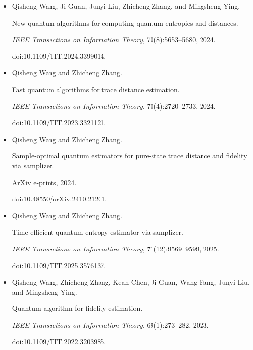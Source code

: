 \begin{itemize}
doi:10.1109/TIT.2024.3447915.





\item[] 
[40]

Qisheng Wang, Ji Guan, Junyi Liu, Zhicheng Zhang, and Mingsheng Ying.


New quantum algorithms for computing quantum entropies and distances.


\emph{IEEE Transactions on Information Theory}, 70(8):5653–5680,
2024.


doi:10.1109/TIT.2024.3399014.





\item[] 
[41]

Qisheng Wang and Zhicheng Zhang.


Fast quantum algorithms for trace distance estimation.


\emph{IEEE Transactions on Information Theory}, 70(4):2720–2733,
2024.


doi:10.1109/TIT.2023.3321121.





\item[] 
[42]

Qisheng Wang and Zhicheng Zhang.


Sample-optimal quantum estimators for pure-state trace distance and
fidelity via samplizer.


ArXiv e-prints, 2024.


doi:10.48550/arXiv.2410.21201.





\item[] 
[43]

Qisheng Wang and Zhicheng Zhang.


Time-efficient quantum entropy estimator via samplizer.


\emph{IEEE Transactions on Information Theory}, 71(12):9569–9599,
2025.


doi:10.1109/TIT.2025.3576137.





\item[] 
[44]

Qisheng Wang, Zhicheng Zhang, Kean Chen, Ji Guan, Wang Fang, Junyi Liu, and
Mingsheng Ying.


Quantum algorithm for fidelity estimation.


\emph{IEEE Transactions on Information Theory}, 69(1):273–282, 2023.


doi:10.1109/TIT.2022.3203985.





\end{itemize}

